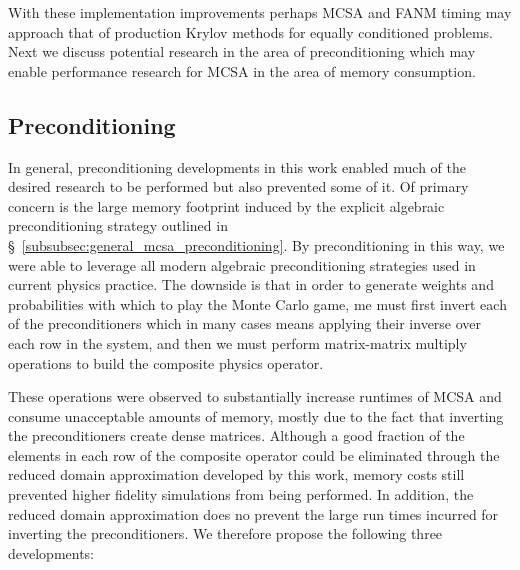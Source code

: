 With these implementation improvements perhaps MCSA and FANM timing
may approach that of production Krylov methods for equally conditioned
problems. Next we discuss potential research in the area of
preconditioning which may enable performance research for MCSA in the
area of memory consumption.

\subsection{Preconditioning}
\label{subsec:future_preconditioning}

In general, preconditioning developments in this work enabled much of
the desired research to be performed but also prevented some of it. Of
primary concern is the large memory footprint induced by the explicit
algebraic preconditioning strategy outlined in
\S~\ref{subsubsec:general_mcsa_preconditioning}. By preconditioning
in this way, we were able to leverage all modern algebraic
preconditioning strategies used in current physics practice. The
downside is that in order to generate weights and probabilities with
which to play the Monte Carlo game, me must first invert each of the
preconditioners which in many cases means applying their inverse over
each row in the system, and then we must perform matrix-matrix
multiply operations to build the composite physics operator. 

These operations were observed to substantially increase runtimes of
MCSA and consume unacceptable amounts of memory, mostly due to the
fact that inverting the preconditioners create dense
matrices. Although a good fraction of the elements in each row of the
composite operator could be eliminated through the reduced domain
approximation developed by this work, memory costs still prevented
higher fidelity simulations from being performed. In addition, the
reduced domain approximation does no prevent the large run times
incurred for inverting the preconditioners. We therefore propose the
following three developments:

